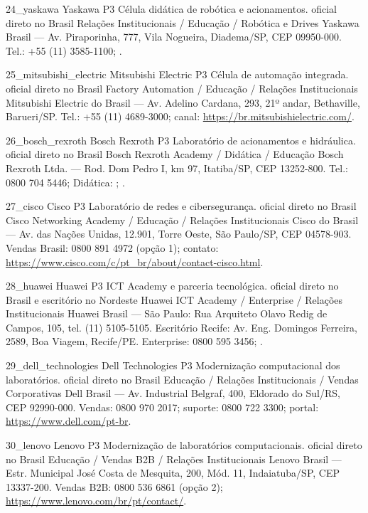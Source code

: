 \ContatoEmpresa
  {24_yaskawa}
  {Yaskawa}
  {P3}
  {Célula didática de robótica e acionamentos.}
  {oficial direto no Brasil}
  {Relações Institucionais / Educação / Robótica e Drives}
  {Yaskawa Brasil — Av. Piraporinha, 777, Vila Nogueira, Diadema/SP, CEP 09950-000. Tel.: +55 (11) 3585-1100; .}

\ContatoEmpresa
  {25_mitsubishi_electric}
  {Mitsubishi Electric}
  {P3}
  {Célula de automação integrada.}
  {oficial direto no Brasil}
  {Factory Automation / Educação / Relações Institucionais}
  {Mitsubishi Electric do Brasil — Av. Adelino Cardana, 293, 21º andar, Bethaville, Barueri/SP. Tel.: +55 (11) 4689-3000; canal: \url{https://br.mitsubishielectric.com/}.}

\ContatoEmpresa
  {26_bosch_rexroth}
  {Bosch Rexroth}
  {P3}
  {Laboratório de acionamentos e hidráulica.}
  {oficial direto no Brasil}
  {Bosch Rexroth Academy / Didática / Educação}
  {Bosch Rexroth Ltda. — Rod. Dom Pedro I, km 97, Itatiba/SP, CEP 13252-800. Tel.: 0800 704 5446; Didática: ; .}

\ContatoEmpresa
  {27_cisco}
  {Cisco}
  {P3}
  {Laboratório de redes e cibersegurança.}
  {oficial direto no Brasil}
  {Cisco Networking Academy / Educação / Relações Institucionais}
  {Cisco do Brasil — Av. das Nações Unidas, 12.901, Torre Oeste, São Paulo/SP, CEP 04578-903. Vendas Brasil: 0800 891 4972 (opção 1); contato: \url{https://www.cisco.com/c/pt_br/about/contact-cisco.html}.}

\ContatoEmpresa
  {28_huawei}
  {Huawei}
  {P3}
  {ICT Academy e parceria tecnológica.}
  {oficial direto no Brasil e escritório no Nordeste}
  {Huawei ICT Academy / Enterprise / Relações Institucionais}
  {Huawei Brasil — São Paulo: Rua Arquiteto Olavo Redig de Campos, 105, tel. (11) 5105-5105. Escritório Recife: Av. Eng. Domingos Ferreira, 2589, Boa Viagem, Recife/PE. Enterprise: 0800 595 3456; .}

\ContatoEmpresa
  {29_dell_technologies}
  {Dell Technologies}
  {P3}
  {Modernização computacional dos laboratórios.}
  {oficial direto no Brasil}
  {Educação / Relações Institucionais / Vendas Corporativas}
  {Dell Brasil — Av. Industrial Belgraf, 400, Eldorado do Sul/RS, CEP 92990-000. Vendas: 0800 970 2017; suporte: 0800 722 3300; portal: \url{https://www.dell.com/pt-br}.}

\ContatoEmpresa
  {30_lenovo}
  {Lenovo}
  {P3}
  {Modernização de laboratórios computacionais.}
  {oficial direto no Brasil}
  {Educação / Vendas B2B / Relações Institucionais}
  {Lenovo Brasil — Estr. Municipal José Costa de Mesquita, 200, Mód. 11, Indaiatuba/SP, CEP 13337-200. Vendas B2B: 0800 536 6861 (opção 2); \url{https://www.lenovo.com/br/pt/contact/}.}

